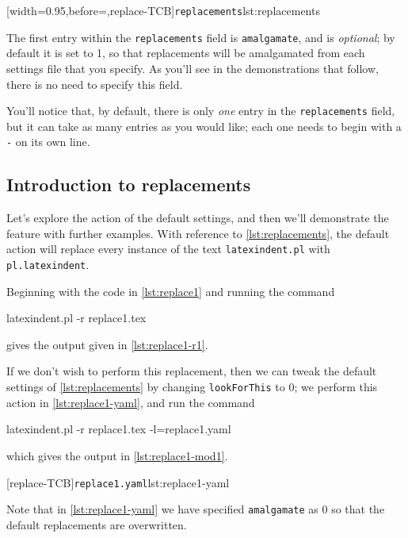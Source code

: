  [width=0.95\linewidth,before=\centering,replace-TCB]{\texttt{replacements}}{lst:replacements}

 The first entry within the \texttt{replacements} field is \texttt{amalgamate}, and is
 \emph{optional}; by default it is set to 1, so that replacements will be amalgamated from
 each settings file that you specify. As you'll see in the demonstrations that follow,
 there is no need to specify this field.

 You'll notice that, by default, there is only \emph{one} entry in the
 \texttt{replacements} field, but it can take as many entries as you would like; each one
 needs to begin with a \texttt{-} on its own line.

\subsection{Introduction to replacements}
 Let's explore the action of the default settings, and then we'll demonstrate the feature
 with further examples. With reference to \cref{lst:replacements}, the default action will
 replace every instance of the text \texttt{latexindent.pl} with \texttt{pl.latexindent}.

 \begin{example}
 Beginning with the code in \cref{lst:replace1} and running the command 
 \begin{commandshell}
latexindent.pl -r replace1.tex
\end{commandshell}
 gives the output given in \cref{lst:replace1-r1}.

 \begin{cmhtcbraster}[raster column skip=.01\linewidth]
 \end{cmhtcbraster}

 If we don't wish to perform this replacement, then we can tweak the default settings of
 \vref{lst:replacements} by changing \texttt{lookForThis} to 0; we perform this action in
 \cref{lst:replace1-yaml}, and run the command 
 \begin{commandshell}
latexindent.pl -r replace1.tex -l=replace1.yaml
\end{commandshell}
 which gives the output in \cref{lst:replace1-mod1}.

 \begin{cmhtcbraster}[raster column skip=.01\linewidth]
  [replace-TCB]{\texttt{replace1.yaml}}{lst:replace1-yaml}
 \end{cmhtcbraster}

 Note that in \cref{lst:replace1-yaml} we have specified \texttt{amalgamate} as 0 so that
 the default replacements are overwritten.
 \end{example}

